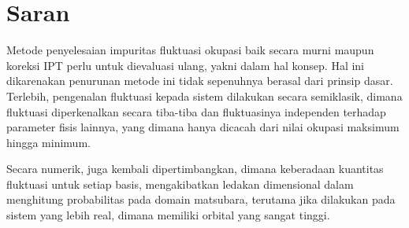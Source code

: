 \section{Saran}

Metode penyelesaian impuritas fluktuasi okupasi baik secara murni maupun koreksi IPT perlu untuk dievaluasi ulang, yakni dalam hal konsep. Hal ini dikarenakan penurunan metode ini tidak sepenuhnya berasal dari prinsip dasar. Terlebih, pengenalan fluktuasi kepada sistem dilakukan secara semiklasik, dimana fluktuasi diperkenalkan secara tiba-tiba dan fluktuasinya independen terhadap parameter fisis lainnya, yang dimana hanya dicacah dari nilai okupasi maksimum hingga minimum.

Secara numerik, juga kembali dipertimbangkan, dimana keberadaan kuantitas fluktuasi untuk setiap basis, mengakibatkan ledakan dimensional dalam menghitung probabilitas pada domain matsubara, terutama jika dilakukan pada sistem yang lebih real, dimana memiliki orbital yang sangat tinggi.